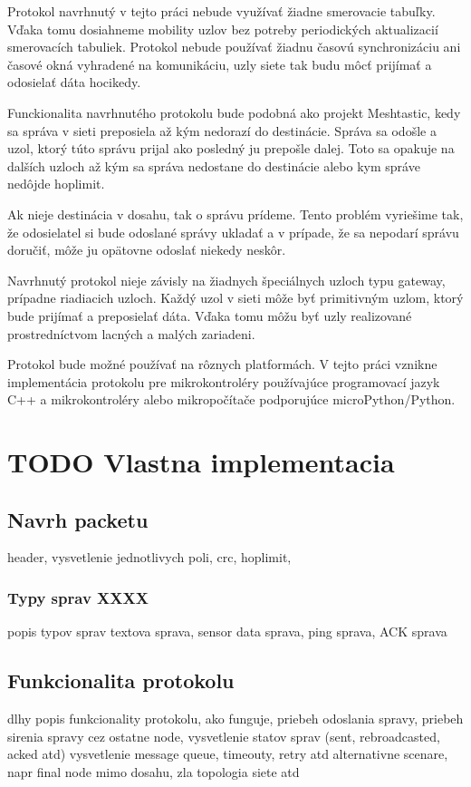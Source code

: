 \documentclass[slovak,master]{diploma}
\begin{document}
Protokol navrhnutý v tejto práci nebude využívať žiadne smerovacie tabuľky. Vďaka tomu dosiahneme mobility uzlov bez potreby 
periodických aktualizacií smerovacích tabuliek. Protokol nebude používať žiadnu časovú synchronizáciu ani časové okná vyhradené na komunikáciu, 
uzly siete tak budu môcť prijímať a odosielať dáta hocikedy.

Funckionalita navrhnutého protokolu bude podobná ako projekt Meshtastic, kedy sa správa v sieti preposiela až kým nedorazí do destinácie.
Správa sa odošle a uzol, ktorý túto správu prijal ako posledný ju prepošle dalej. Toto sa opakuje na dalších uzloch až kým sa správa nedostane do destinácie alebo kym správe nedôjde hoplimit.

Ak nieje destinácia v dosahu, tak o správu prídeme. Tento problém vyriešime tak, že odosielatel si bude odoslané správy ukladať a v prípade, že sa nepodarí správu doručiť, môže ju opätovne 
odoslať niekedy neskôr.

Navrhnutý protokol nieje závisly na žiadnych špeciálnych uzloch typu gateway, prípadne riadiacich uzloch. Každý uzol v sieti môže byť primitivným uzlom, ktorý bude prijímať a preposielať dáta.
Vďaka tomu môžu byť uzly realizované prostredníctvom lacných a malých zariadeni.

Protokol bude možné používať na rôznych platformách. V tejto práci vznikne implementácia protokolu pre mikrokontroléry používajúce programovací jazyk C++ a 
mikrokontroléry alebo mikropočítače podporujúce microPython/Python.

\chapter{TODO Vlastna implementacia}
\section{Navrh packetu}
header, vysvetlenie jednotlivych poli, crc, hoplimit,
\subsection{Typy sprav XXXX}
popis typov sprav
textova sprava, sensor data sprava, ping sprava, ACK sprava

\section{Funkcionalita protokolu}
dlhy popis funkcionality protokolu, ako funguje, priebeh odoslania spravy, priebeh sirenia spravy cez ostatne node,
vysvetlenie statov sprav (sent, rebroadcasted, acked atd)
vysvetlenie message queue, timeouty, retry atd
alternativne scenare, napr final node mimo dosahu, zla topologia siete atd
\end{document}
